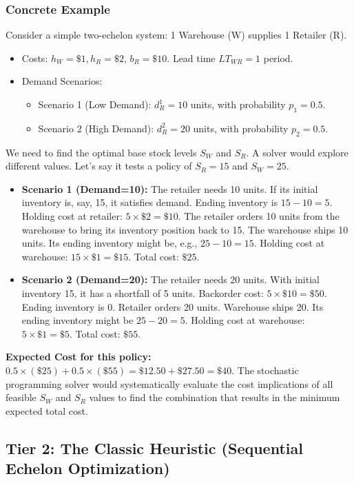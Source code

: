 \documentclass{article}
\begin{document}
\subsubsection{Concrete Example}
Consider a simple two-echelon system: 1 Warehouse (W) supplies 1 Retailer (R).
\begin{itemize}
    \item Costs: $h_W = \$1, h_R = \$2$, $b_R = \$10$. Lead time $LT_{WR} = 1$ period.
    \item Demand Scenarios: 
    \begin{itemize}
        \item Scenario 1 (Low Demand): $d_{R}^1 = 10$ units, with probability $p_1 = 0.5$.
        \item Scenario 2 (High Demand): $d_{R}^2 = 20$ units, with probability $p_2 = 0.5$.
    \end{itemize}
\end{itemize}
We need to find the optimal base stock levels $S_W$ and $S_R$. A solver would explore different values. Let's say it tests a policy of $S_R = 15$ and $S_W=25$.

\begin{itemize}
    \item \textbf{Scenario 1 (Demand=10):}
    The retailer needs 10 units. If its initial inventory is, say, 15, it satisfies demand. Ending inventory is $15 - 10 = 5$. Holding cost at retailer: $5 \times \$2 = \$10$. The retailer orders 10 units from the warehouse to bring its inventory position back to 15. The warehouse ships 10 units. Its ending inventory might be, e.g., $25-10=15$. Holding cost at warehouse: $15 \times \$1 = \$15$. Total cost: $\$25$.
    
    \item \textbf{Scenario 2 (Demand=20):}
    The retailer needs 20 units. With initial inventory 15, it has a shortfall of 5 units. Backorder cost: $5 \times \$10 = \$50$. Ending inventory is 0. Retailer orders 20 units. Warehouse ships 20. Its ending inventory might be $25-20=5$. Holding cost at warehouse: $5 \times \$1 = \$5$. Total cost: $\$55$.
\end{itemize}
\textbf{Expected Cost for this policy:} $0.5 \times (\$25) + 0.5 \times (\$55) = \$12.50 + \$27.50 = \$40$.
The stochastic programming solver would systematically evaluate the cost implications of all feasible $S_W$ and $S_R$ values to find the combination that results in the minimum expected total cost.

\subsection{Tier 2: The Classic Heuristic (Sequential Echelon Optimization)}
\end{document}
